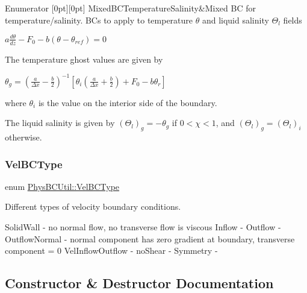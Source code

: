 \begin{DoxyEnumFields}{Enumerator}
[0pt][0pt]{}\mbox{\label{class_phys_b_c_util_a1beb9821cf9e783e3742b82b7070c97aa55808703af58fdb3753923ee6a5ecd0d}} 
Mixed\+B\+C\+Temperature\+Salinity&Mixed BC for temperature/salinity. B\+Cs to apply to temperature $ \theta $ and liquid salinity $ \Theta_l $ fields

$ a \frac{d \theta}{dz} - F_0 - b(\theta - \theta_{ref}) = 0 $

The temperature ghost values are given by

$ \theta_g = \left( \frac{a}{\Delta x} - \frac{b}{2} \right)^{-1} \left[ \theta_i \left( \frac{a}{\Delta x} + \frac{b}{2} \right) + F_0 - b \theta_r \right] $

where $ \theta_i $ is the value on the interior side of the boundary.

The liquid salinity is given by $(\Theta_l)_g = - \theta_g$ if $0 < \chi < 1$, and $ (\Theta_l)_g = (\Theta_l)_i $ otherwise. \\
\hline

\end{DoxyEnumFields}
\mbox{\label{class_phys_b_c_util_a1aaacd3006840779878dc6287355a358}} 
\subsubsection{\texorpdfstring{Vel\+B\+C\+Type}{VelBCType}}
{\footnotesize\ttfamily enum \hyperlink{class_phys_b_c_util_a1aaacd3006840779878dc6287355a358}{Phys\+B\+C\+Util\+::\+Vel\+B\+C\+Type}}



Different types of velocity boundary conditions. 

Solid\+Wall -\/ no normal flow, no transverse flow is viscous Inflow -\/ Outflow -\/ Outflow\+Normal -\/ normal component has zero gradient at boundary, transverse component = 0 Vel\+Inflow\+Outflow -\/ no\+Shear -\/ Symmetry -\/ 

\subsection{Constructor \& Destructor Documentation}
\mbox{\label{class_phys_b_c_util_a08574a3a8d645947c3914ef6eb56694f}} 
